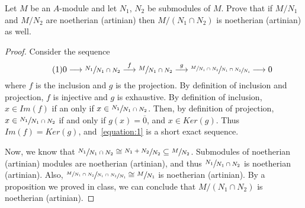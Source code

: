 \begin{problem}
    Let $M$ be an $A$-module and let $N_1$, $N_2$ be submodules of $M$.
    Prove that if $M/N_1$ and $M/N_2$ are noetherian (artinian) then $M/(N_1 \cap N_2)$ is noetherian (artinian) as well.
    \begin{sol}
        \begin{proof}
            Consider the sequence
            \[ \label{equation:1} \tag{1}
                0 \longrightarrow \sfrac{N_1}{N_1 \cap N_2} \overset{f}{\longrightarrow} \sfrac{M}{N_1 \cap N_2} \overset{g}{\longrightarrow} \sfrac{\sfrac{M}{N_1 \cap N_2}}{\sfrac{N_1 \cap N_2}{N_1}} \longrightarrow 0
            \]
            where $f$ is the inclusion and $g$ is the projection.
            By definition of inclusion and projection, $f$ is injective and $g$ is exhaustive.
            By definition of inclusion, $x \in Im(f)$ if an only if $x \in \sfrac{N_1}{N_1 \cap N_2}$.
            Then, by definition of projection, $x \in \sfrac{N_1}{N_1 \cap N_2}$ if and only if $g(x) = \overline{0}$, and $x \in Ker(g)$.
            Thus $Im(f) = Ker(g)$, and~\ref{equation:1} is a short exact sequence.

            Now, we know that $\sfrac{N_1}{N_1 \cap N_2} \cong \sfrac{N_1 + N_2}{N_2} \subseteq \sfrac{M}{N_2}$.
            Submodules of noetherian (artinian) modules are noetherian (artinian), and thus $\sfrac{N_1}{N_1 \cap N_2}$ is noetherian (artinian).
            Also, $\sfrac{\sfrac{M}{N_1 \cap N_2}}{\sfrac{N_1 \cap N_2}{N_1}} \cong \sfrac{M}{N_1}$ is noetherian (artinian).
            By a proposition we proved in class, we can conclude that $M/(N_1 \cap N_2)$ is noetherian (artinian).
        \end{proof}
    \end{sol}
\end{problem}